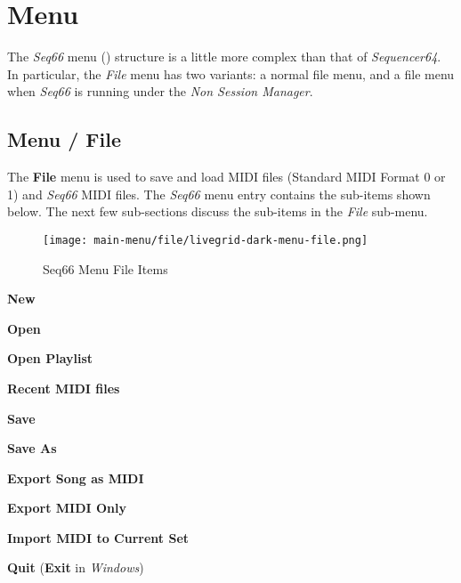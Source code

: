 %
%
%

\section{Menu}
\label{sec:seq66_menu}

   The \textsl{Seq66} menu
   () structure is a little more complex than
   that of \textsl{Sequencer64}.  In particular, the \textsl{File} menu has two
   variants:  a normal file menu, and a file menu when \textsl{Seq66} is
   running under the \textsl{Non Session Manager}.

\subsection{Menu / File}
\label{subsec:seq66_menu_file}

   The \textbf{File} menu is used to save and load MIDI files
   (Standard MIDI Format 0 or 1) and \textsl{Seq66} MIDI
   files.
   The \textsl{Seq66} menu entry contains the sub-items shown below.
   The next few sub-sections discuss
   the sub-items in the \textsl{File} sub-menu.

\begin{figure}[H]
   \centering 
   \texttt{[image: main-menu/file/livegrid-dark-menu-file.png]}
   \caption{Seq66 Menu File Items}
   \label{fig:seq66_menu_file_items}
\end{figure}

   \begin{enumber}
      \item \textbf{New}
      \item \textbf{Open}
      \item \textbf{Open Playlist}
      \item \textbf{Recent MIDI files}
      \item \textbf{Save}
      \item \textbf{Save As}
      \item \textbf{Export Song as MIDI}
      \item \textbf{Export MIDI Only}
      \item \textbf{Import MIDI to Current Set}
      \item \textbf{Quit} (\textbf{Exit} in \textsl{Windows})
   \end{enumber}

